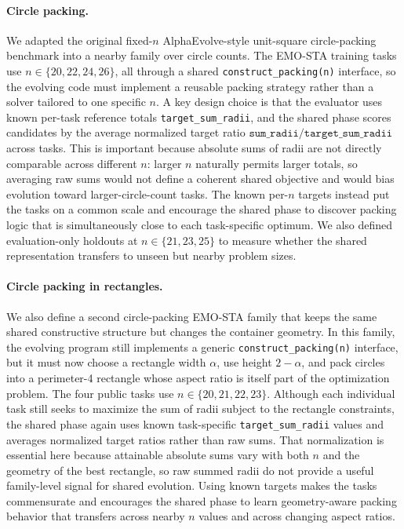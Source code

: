 \paragraph{Circle packing.}
We adapted the original fixed-\(n\) AlphaEvolve-style unit-square circle-packing benchmark into a nearby family over circle counts. The EMO-STA training tasks use \(n \in \{20, 22, 24, 26\}\), all through a shared \texttt{construct\_packing(n)} interface, so the evolving code must implement a reusable packing strategy rather than a solver tailored to one specific \(n\). A key design choice is that the evaluator uses known per-task reference totals \texttt{target\_sum\_radii}, and the shared phase scores candidates by the average normalized target ratio \(\texttt{sum\_radii} / \texttt{target\_sum\_radii}\) across tasks. This is important because absolute sums of radii are not directly comparable across different \(n\): larger \(n\) naturally permits larger totals, so averaging raw sums would not define a coherent shared objective and would bias evolution toward larger-circle-count tasks. The known per-\(n\) targets instead put the tasks on a common scale and encourage the shared phase to discover packing logic that is simultaneously close to each task-specific optimum. We also defined evaluation-only holdouts at \(n \in \{21, 23, 25\}\) to measure whether the shared representation transfers to unseen but nearby problem sizes.

\paragraph{Circle packing in rectangles.}
We also define a second circle-packing EMO-STA family that keeps the same shared constructive structure but changes the container geometry. In this family, the evolving program still implements a generic \texttt{construct\_packing(n)} interface, but it must now choose a rectangle width \(\alpha\), use height \(2-\alpha\), and pack circles into a perimeter-4 rectangle whose aspect ratio is itself part of the optimization problem. The four public tasks use \(n \in \{20, 21, 22, 23\}\). Although each individual task still seeks to maximize the sum of radii subject to the rectangle constraints, the shared phase again uses known task-specific \texttt{target\_sum\_radii} values and averages normalized target ratios rather than raw sums. That normalization is essential here because attainable absolute sums vary with both \(n\) and the geometry of the best rectangle, so raw summed radii do not provide a useful family-level signal for shared evolution. Using known targets makes the tasks commensurate and encourages the shared phase to learn geometry-aware packing behavior that transfers across nearby \(n\) values and across changing aspect ratios.

